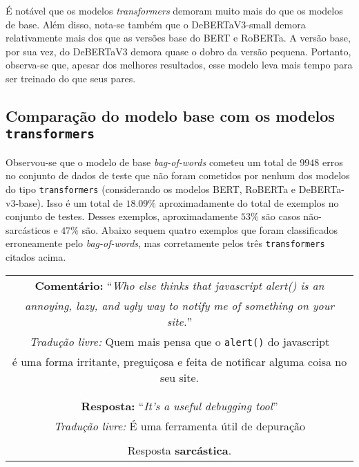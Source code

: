 É notável que os modelos \textit{transformers} demoram muito mais do que os
modelos de base. Além disso, nota-se também que o DeBERTaV3-small demora
relativamente mais dos que as versões base do BERT e RoBERTa. A versão base, por
sua vez, do DeBERTaV3 demora quase o dobro da versão pequena. Portanto,
observa-se que, apesar dos melhores resultados, esse modelo leva mais tempo para
ser treinado do que seus pares.

\subsection{Comparação do modelo base com os modelos \texttt{transformers}}%
\label{sub:comparacao_do_modelo_base_com_os_modelos_transformers}

Observou-se que o modelo de base \textit{bag-of-words} cometeu um total de
$9948$ erros no conjunto de dados de teste que não foram cometidos por nenhum
dos modelos do tipo \texttt{transformers} (considerando os modelos
BERT, RoBERTa e DeBERTa-v3-base). Isso é um total de
$18.09\%$ aproximadamente do total de exemplos no conjunto de testes. Desses
exemplos, aproximadamente $53\%$ são casos não-sarcásticos e $47\%$ são. Abaixo
sequem quatro exemplos que foram classificados erroneamente pelo
\textit{bag-of-words}, mas corretamente pelos três \texttt{transformers} citados
acima. \jump

\begin{center}
\begin{tabular}{|c|}

\hline

\textbf{Comentário:} ``\textit{Who else thinks that javascript alert() is an} \\
\textit{annoying, lazy, and ugly way to notify me of something on your site.}''
\\

\textit{Tradução livre:} Quem mais pensa que o \texttt{alert()} do javascript \\
é uma forma irritante, preguiçosa e feita de notificar alguma coisa no seu
site. \\\\

\hline

\\

\textbf{Resposta:} ``\textit{It's a useful debugging tool}'' \\

\textit{Tradução livre:} É uma ferramenta útil de depuração \\ \\


Resposta \textbf{sarcástica}.

\\ \hline

\end{tabular}
\end{center}


